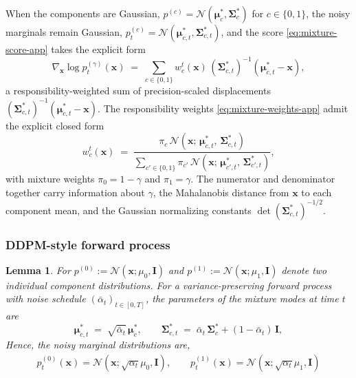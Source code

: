 \documentclass[11pt]{article}
\newcommand{\vect}[1]{\mathbf{#1}}
\theoremstyle{plain}
\newtheorem{lemma}[theorem]{Lemma}
\newcommand{\1}{\mathbbm{1}}
\newcommand{\vx}{\vect{x}}
\newcommand{\pdist}[2][]{p_{#1}^{(#2)}}
\begin{document}
\begin{appendices}
When the components are Gaussian, $\pdist{c} = \mathcal{N}(\boldsymbol{\mu}_c^*, \boldsymbol{\Sigma}_c^*)$ for $c \in \{0,1\}$, the noisy marginals remain Gaussian, $\pdist[t]{c} = \mathcal{N}(\boldsymbol{\mu}_{c,t}^*, \boldsymbol{\Sigma}_{c,t}^*)$, and the score \eqref{eq:mixture-score-app} takes the explicit form
\begin{equation}
    \nabla_{\vx} \log \pdist[t]{\gamma}({\vx}) \;=\; \sum_{c \in \{0,1\}} w_c^t({\vx})\, (\boldsymbol{\Sigma}_{c,t}^*)^{-1} (\boldsymbol{\mu}_{c,t}^* - {\vx}),
    \label{eq:gaussian-mixture-score}
\end{equation}
a responsibility-weighted sum of precision-scaled displacements $(\boldsymbol{\Sigma}_{c,t}^*)^{-1}(\boldsymbol{\mu}_{c,t}^* - {\vx})$. The responsibility weights \eqref{eq:mixture-weights-app} admit the explicit closed form
\begin{equation}
    w_c^t({\vx}) \;=\; \frac{\pi_c\, \mathcal{N}\!\left({\vx};\, \boldsymbol{\mu}_{c,t}^*,\, \boldsymbol{\Sigma}_{c,t}^*\right)}{\sum_{c' \in \{0,1\}} \pi_{c'}\, \mathcal{N}\!\left({\vx};\, \boldsymbol{\mu}_{c',t}^*,\, \boldsymbol{\Sigma}_{c',t}^*\right)},
    \label{eq:responsibility-weights}
\end{equation}
with mixture weights $\pi_0 = 1-\gamma$ and $\pi_1 = \gamma$. The numerator and denominator together carry information about $\gamma$, the Mahalanobis distance from ${\vx}$ to each component mean, and the Gaussian normalizing constants $\det(\boldsymbol{\Sigma}_{c,t}^*)^{-1/2}$.

\subsubsection{DDPM-style forward process} 

\begin{lemma}\label{lemma:mix_over_time}
For $\pdist{0}:=\mathcal{N}(\vx;\mu_0,\vect I)$ and $\pdist{1}:=\mathcal{N}(\vx;\mu_1,\vect I)$ denote two individual component distributions. For a variance-preserving forward process with noise schedule $(\bar{\alpha}_t)_{t \in [0,T]}$, the parameters of the mixture modes at time $t$ are
\begin{equation}
    \boldsymbol{\mu}_{c,t}^* \;=\; \sqrt{\bar{\alpha}_t}\, \boldsymbol{\mu}_c^*, \qquad
    \boldsymbol{\Sigma}_{c,t}^* \;=\; \bar{\alpha}_t\, \boldsymbol{\Sigma}_c^* + (1 - \bar{\alpha}_t)\, \mathbf{I},
    \label{eq:ddpm-perturbation}
\end{equation}
Hence, the noisy marginal distributions are,     
    \begin{align*}
        \pdist[t]{0}(\vx) = \mathcal{N}(\vx;\sqrt{\alpha_t} \mu_0, \vect I),
          \qquad 
        \pdist[t]{1}(\vx) = \mathcal{N}(\vx;\sqrt{\alpha_t} \mu_1, \vect I)
    \end{align*}
\end{lemma}



\end{appendices}
\end{document}
